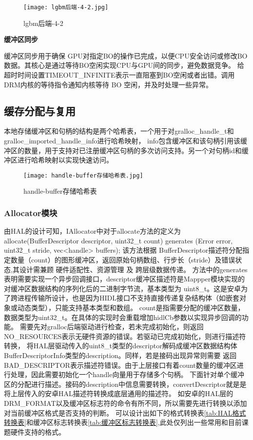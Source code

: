 \begin{figure}[h]
  \centering
  \texttt{[image: lgbm后端-4-2.jpg]}
  \caption{lgbm后端-4-2}
  \label{fig:lgbm后端-4-2}
\end{figure} 

\textbf{缓冲区同步}

缓冲区同步用于确保 GPU对指定BO的操作已完成，以便CPU安全访问或修改BO数据。其核心是通过​等待BO空闲​实现CPU与GPU间的同步，避免数据竞争。
给超时时间设置TIMEOUT\_INFINITE表示一直阻塞到BO空闲或者出错。调用DRM内核的等待指令通知内核等待 BO 空闲，并及时处理一些异常。

\subsection{缓存分配与复用}

本地存储缓冲区和句柄的结构是两个哈希表，一个用于对gralloc\_handle\_t和gralloc\_imported\_handle\_info进行哈希映射，
info包含缓冲区和该句柄引用该缓冲区的数量，用于支持对已注册缓冲区句柄的多次访问支持。另一个对句柄id和缓冲区进行哈希映射以实现快速访问。

\begin{figure}[h]
  \centering
  \texttt{[image: handle-buffer存储哈希表.jpg]}
  \caption{handle-buffer存储哈希表}
  \label{fig:handle-buffer存储哈希表}
\end{figure}

\subsubsection{Allocator模块}
由HAL的设计可知，IAllocator中对于allocate方法的定义为
allocate(BufferDescriptor descriptor, uint32\_t count) generates (Error error, uint32\_t stride, vec<handle> buffers);
该方法根据 BufferDescriptor描述符分配指定数量（count）的图形缓冲区，返回原始句柄数组、行步长（stride）及错误状态,其设计需兼顾 硬件适配性、资源管理 及 跨层级数据传递。
方法中的generates表明需要实现一个异步回调接口，descriptor缓冲区描述符是Mappper模块实现的对缓冲区数据结构的序列化后的二进制字节流，基本类型为
uint8\_t。这是安卓为了跨进程传输所设计，也是因为HIDL接口不支持直接传递复杂结构体（如嵌套对象或动态类型），只能支持基本类型和数组。
count是指需要分配的缓冲区数量，数据类型为uint32\_t。在具体的实现时会重载增加hidlCb参数以实现异步回调的功能。
需要先对gralloc后端驱动进行检查，若未完成初始化，则返回NO\_RESOURCES表示无硬件资源的错误。若驱动已完成初始化，则进行描述符转换，
将HAL层驱动传入的uint8\_t类型的descriptor解码成缓冲区数据结构体BufferDescriptorInfo类型的description。同样，若是接码出现异常则需要
返回BAD\_DESCRIPTOR表示描述符错误。由于上层接口有着count数量的缓冲区进行处理，因此需要初始化一个handle向量用于存储多个句柄。
下面针对单个缓冲区的分配进行描述。接码的description中信息需要转换，convertDescriptor就是是将上层传入的安卓HAL描述符转换成底层通用的描述符。
如安卓的HAL层的DRM\_FORMAT以及缓冲区标志符的命令有所不同，所以需要先进行转换以添加对当前缓冲区格式是否支持的判断。
可以设计出如下的格式转换表\ref{tab:HAL格式转换表}和缓冲区标志转换表\ref{tab:缓冲区标志转换表},此处仅列出一些常用和目前课题硬件支持的格式。

